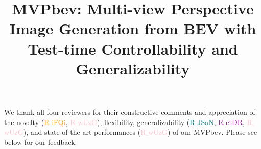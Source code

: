 \documentclass[sigconf,authordraft]{acmart}
\begin{document}
\title{MVPbev: Multi-view Perspective Image Generation from BEV with Test-time Controllability and Generalizability}




\newcommand{\issue}[1]{\vspace{0.1em}\noindent \textcolor{purple}{\textbf{#1 \hspace{0.2em}}}}
\newcommand{\idx}[1]{\hspace{0.2em}\textcolor{red}{\textbf{#1}}}

\newcommand{\rone}{\textcolor{orange}{\footnotesize R$\_$iFQi}}
\newcommand{\rtwo}{\textcolor{teal}{\footnotesize R$\_$JSaN}}
\newcommand{\rthree}{\textcolor{purple}{\footnotesize R$\_$etDR}}
\newcommand{\rfour}{\textcolor{pink}{\footnotesize R$\_$wUzG}}

\maketitle
We thank all four reviewers for their constructive comments and appreciation of the novelty (\rone, \rfour), flexibility, generalizability (\rtwo, \rthree, \rfour), and state-of-the-art performances (\rfour) of our MVPbev. %
Please see below for our feedback.
\end{document}
